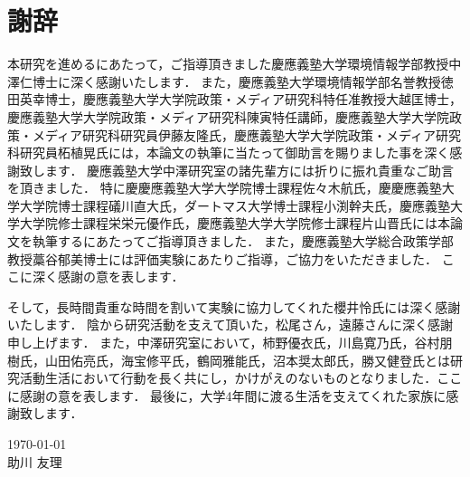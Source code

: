 \chapter*{謝辞}

本研究を進めるにあたって，ご指導頂きました慶應義塾大学環境情報学部教授中澤仁博士に深く感謝いたします．
また，慶應義塾大学環境情報学部名誉教授徳田英幸博士，慶應義塾大学大学院政策・メディア研究科特任准教授大越匡博士，慶應義塾大学大学院政策・メディア研究科陳寅特任講師，慶應義塾大学大学院政策・メディア研究科研究員伊藤友隆氏，慶應義塾大学大学院政策・メディア研究科研究員柘植晃氏には，本論文の執筆に当たって御助言を賜りました事を深く感謝致します．
慶應義塾大学中澤研究室の諸先輩方には折りに振れ貴重なご助言を頂きました．
特に慶慶應義塾大学大学院博士課程佐々木航氏，慶慶應義塾大学大学院博士課程礒川直大氏，ダートマス大学博士課程小渕幹夫氏，慶應義塾大学大学院修士課程栄栄元優作氏，慶應義塾大学大学院修士課程片山晋氏には本論文を執筆するにあたってご指導頂きました．
また，慶應義塾大学総合政策学部教授藁谷郁美博士には評価実験にあたりご指導，ご協力をいただきました．
ここに深く感謝の意を表します．

そして，長時間貴重な時間を割いて実験に協力してくれた櫻井怜氏には深く感謝いたします．
陰から研究活動を支えて頂いた，松尾さん，遠藤さんに深く感謝申し上げます．
また，中澤研究室において，柿野優衣氏，川島寛乃氏，谷村朋樹氏，山田佑亮氏，海宝修平氏，鶴岡雅能氏，沼本奨太郎氏，勝又健登氏とは研究活動生活において行動を長く共にし，かけがえのないものとなりました．ここに感謝の意を表します．
最後に，大学4年間に渡る生活を支えてくれた家族に感謝致します．

\begin{flushright}
\today\\
助川 友理
\end{flushright}